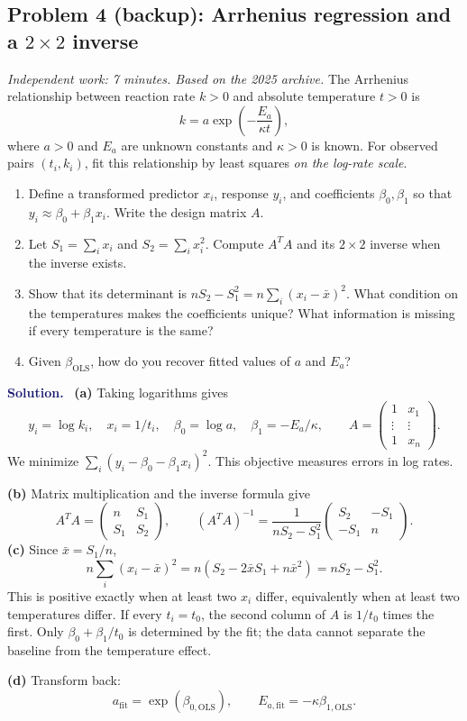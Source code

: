 \documentclass[11pt]{article}
\newcommand{\ols}{\mathrm{OLS}}
\newenvironment{answer}{\par\medskip\noindent\textcolor{MidnightBlue}{\textbf{Solution.}}\ }{\par\medskip}
\newcommand{\workingspace}[1]{}
\newcommand{\workingspace}[1]{\vspace{#1}}
\begin{document}
\subsection*{Problem 4 (backup): Arrhenius regression and a $2\times2$ inverse}
\noindent\textit{Independent work: 7 minutes. Based on the 2025 archive.}
The Arrhenius relationship between reaction rate $k>0$ and absolute
temperature $t>0$ is
\[
 k=a\exp\!\left(-\frac{E_a}{\kappa t}\right),
\]
where $a>0$ and $E_a$ are unknown constants and $\kappa>0$ is known.
For observed pairs $(t_i,k_i)$, fit this relationship by least squares
\emph{on the log-rate scale}.
\begin{enumerate}
 \item Define a transformed predictor $x_i$, response $y_i$, and
 coefficients $\beta_0,\beta_1$ so that $y_i\approx\beta_0+\beta_1x_i$.
 Write the design matrix $A$.
 \item Let $S_1=\sum_i x_i$ and $S_2=\sum_i x_i^2$.
 Compute $A^TA$ and its $2\times2$ inverse when the inverse exists.
 \item Show that its determinant is
 $nS_2-S_1^2=n\sum_i(x_i-\bar{x})^2$.
 What condition on the temperatures makes the coefficients unique?
 What information is missing if every temperature is the same?
 \item Given $\beta_{\ols}$, how do you recover fitted values of
 $a$ and $E_a$?
\end{enumerate}
\workingspace{9cm}
\begin{answer}
\textbf{(a)} Taking logarithms gives
\[
 y_i=\log k_i,\quad x_i=1/t_i,\quad
 \beta_0=\log a,\quad \beta_1=-E_a/\kappa,\qquad
 A=\begin{pmatrix}1&x_1\\\vdots&\vdots\\1&x_n\end{pmatrix}.
\]
We minimize $\sum_i(y_i-\beta_0-\beta_1x_i)^2$.
This objective measures errors in log rates.

\textbf{(b)} Matrix multiplication and the inverse formula give
\[
 A^TA=\begin{pmatrix}n&S_1\\S_1&S_2\end{pmatrix},\qquad
 (A^TA)^{-1}=\frac1{nS_2-S_1^2}
 \begin{pmatrix}S_2&-S_1\\-S_1&n\end{pmatrix}.
\]
\textbf{(c)} Since $\bar{x}=S_1/n$,
\[
 n\sum_i(x_i-\bar{x})^2
 =n(S_2-2\bar{x}S_1+n\bar{x}^2)=nS_2-S_1^2.
\]
This is positive exactly when at least two $x_i$ differ, equivalently
when at least two temperatures differ. If every $t_i=t_0$, the second
column of $A$ is $1/t_0$ times the first. Only
$\beta_0+\beta_1/t_0$ is determined by the fit; the data cannot separate
the baseline from the temperature effect.

\textbf{(d)} Transform back:
\[
 \boxed{a_{\mathrm{fit}}=\exp(\beta_{0,\ols}),\qquad
 E_{a,\mathrm{fit}}=-\kappa\beta_{1,\ols}.}
\]
\end{answer}
\end{document}
